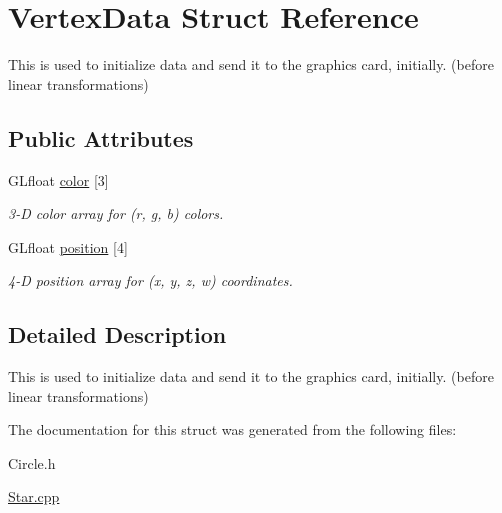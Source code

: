 \hypertarget{struct_vertex_data}{}\section{Vertex\+Data Struct Reference}
\label{struct_vertex_data}


This is used to initialize data and send it to the graphics card, initially. (before linear transformations)  


\subsection*{Public Attributes}
\begin{DoxyCompactItemize}
\item 
\mbox{\label{struct_vertex_data_a70b8efbf22424d8e721d0c017cf542bd}} 
G\+Lfloat \hyperlink{struct_vertex_data_a70b8efbf22424d8e721d0c017cf542bd}{color} \mbox{[}3\mbox{]}
\begin{DoxyCompactList}\small\item\em 3-\/D color array for (r, g, b) colors. \end{DoxyCompactList}\item 
\mbox{\label{struct_vertex_data_afe713eadd3941f9fd541bd5a3913d213}} 
G\+Lfloat \hyperlink{struct_vertex_data_afe713eadd3941f9fd541bd5a3913d213}{position} \mbox{[}4\mbox{]}
\begin{DoxyCompactList}\small\item\em 4-\/D position array for (x, y, z, w) coordinates. \end{DoxyCompactList}\end{DoxyCompactItemize}


\subsection{Detailed Description}
This is used to initialize data and send it to the graphics card, initially. (before linear transformations) 

The documentation for this struct was generated from the following files\+:\begin{DoxyCompactItemize}
\item 
Circle.\+h\item 
\hyperlink{_star_8cpp}{Star.\+cpp}\end{DoxyCompactItemize}
